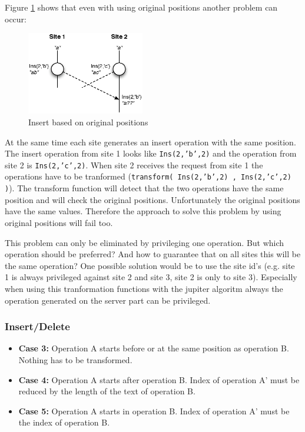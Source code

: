 \begin{itemize}
Figure \ref{Insert based on original positions} shows that even with using original positions another problem can occur:
\begin{figure}[H]
\centering
\includegraphics[height=3.63cm,width=5.13cm]{../../images/algo-impl/transform_ins_ins_origpos.eps}
\caption{Insert based on original positions}
\label{Insert based on original positions}
\end{figure}
At the same time each site generates an insert operation with the same position. The insert operation from site 1 looks like \texttt{Ins(2,'b',2)} and the operation from site 2 is \texttt{Ins(2,'c',2)}. When site 2 receives the request from site 1 the operations have to be tranformed (\texttt{transform( Ins(2,'b',2) , Ins(2,'c',2) )}). The transform function will detect that the two operations have the same position and will check the original positions. Unfortunately the original positions have the same values. Therefore the approach to solve this problem by using original positions will fail too.

This problem can only be eliminated by privileging one operation. But which operation should be preferred? And how to guarantee that on all sites this will be the same operation? One possible solution would be to use the site id's (e.g. site 1 is always privileged against site 2 and site 3, site 2 is only to site 3). Especially when using this tranformation functions with the jupiter algoritm always the operation generated on the server part can be privileged.
\end{itemize}

\subsubsection{Insert/Delete}
\begin{itemize}
\item \textbf{Case 3:}
Operation A starts before or at the same position as operation B. Nothing has to be transformed.
\item \textbf{Case 4:}
Operation A starts after operation B. Index of operation A' must be reduced by the length of the text of operation B.
\item \textbf{Case 5:}
Operation A starts in operation B. Index of operation A' must be the index of operation B.
\end{itemize}

